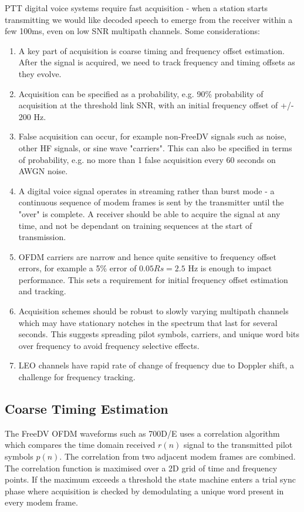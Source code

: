 \documentclass{article}
\begin{document}
PTT digital voice systems require fast acquisition - when a station starts transmitting we would like decoded speech to emerge from the receiver within a few 100ms, even on low SNR multipath channels.  Some considerations:
\begin{enumerate}
\item A key part of acquisition is coarse timing and frequency offset estimation.  After the signal is acquired, we need to track frequency and timing offsets as they evolve.
\item Acquisition can be specified as a probability, e.g. 90\% probability of acquisition at the threshold link SNR, with an initial frequency offset of +/- 200 Hz.
\item False acquisition can occur, for example non-FreeDV signals such as noise, other HF signals, or sine wave "carriers". This can also be specified in terms of probability, e.g. no more than 1 false acquisition every 60 seconds on AWGN noise. 
\item A digital voice signal operates in streaming rather than burst mode - a continuous sequence of modem frames is sent by the transmitter until the "over" is complete.  A receiver should be able to acquire the signal at any time, and not be dependant on training sequences at the start of transmission.
\item OFDM carriers are narrow and hence quite sensitive to frequency offset errors, for example a 5\% error of $0.05Rs=2.5$ Hz is enough to impact performance. This sets a requirement for initial frequency offset estimation and tracking.
\item Acquisition schemes should be robust to slowly varying multipath channels which may have stationary notches in the spectrum that last for several seconds.  This suggests spreading pilot symbols, carriers, and unique word bits over frequency to avoid frequency selective effects.
\item LEO channels have rapid rate of change of frequency due to Doppler shift, a challenge for frequency tracking.
\end{enumerate}

\subsection{Coarse Timing Estimation}

The FreeDV OFDM waveforms such as 700D/E uses a correlation algorithm which compares the time domain received $r(n)$ signal to the transmitted pilot symbols $p(n)$.  The correlation from two adjacent modem frames are combined.  The correlation function is maximised over a 2D grid of time and frequency points.  If the maximum exceeds a threshold the state machine enters a trial sync phase where acquisition is checked by demodulating a unique word present in every modem frame.
\end{document}
